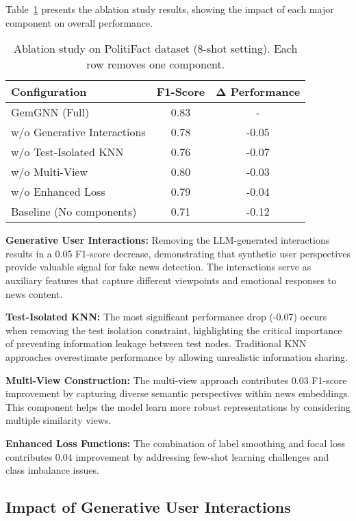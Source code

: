 Table~\ref{tab:ablation:components} presents the ablation study results, showing the impact of each major component on overall performance.

\begin{table}[htbp]
\centering
\caption{Ablation study on PolitiFact dataset (8-shot setting). Each row removes one component.}
\label{tab:ablation:components}
\begin{tabular}{lcc}
\toprule
\textbf{Configuration} & \textbf{F1-Score} & \textbf{Δ Performance} \\
\midrule
GemGNN (Full) & 0.83 & - \\
\midrule
w/o Generative Interactions & 0.78 & -0.05 \\
w/o Test-Isolated KNN & 0.76 & -0.07 \\
w/o Multi-View & 0.80 & -0.03 \\
w/o Enhanced Loss & 0.79 & -0.04 \\
\midrule
Baseline (No components) & 0.71 & -0.12 \\
\bottomrule
\end{tabular}
\end{table}

\textbf{Generative User Interactions:} Removing the LLM-generated interactions results in a 0.05 F1-score decrease, demonstrating that synthetic user perspectives provide valuable signal for fake news detection. The interactions serve as auxiliary features that capture different viewpoints and emotional responses to news content.

\textbf{Test-Isolated KNN:} The most significant performance drop (-0.07) occurs when removing the test isolation constraint, highlighting the critical importance of preventing information leakage between test nodes. Traditional KNN approaches overestimate performance by allowing unrealistic information sharing.

\textbf{Multi-View Construction:} The multi-view approach contributes 0.03 F1-score improvement by capturing diverse semantic perspectives within news embeddings. This component helps the model learn more robust representations by considering multiple similarity views.

\textbf{Enhanced Loss Functions:} The combination of label smoothing and focal loss contributes 0.04 improvement by addressing few-shot learning challenges and class imbalance issues.

\subsection{Impact of Generative User Interactions}

